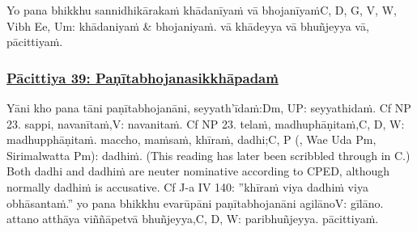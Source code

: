Yo pana bhikkhu sannidhikārakaṁ khādanīyaṁ vā bhojanīyaṁ\makeatletter\hyperlink{endnote-appendix}\makeatother C, D, G, V, W, Vibh Ee, Um: khādaniyaṁ & bhojaniyaṁ. vā khādeyya vā bhuñjeyya vā, pācittiyaṁ.



\subsubsection*{\hyperref[exp39]{Pācittiya 39: Paṇītabhojanasikkhāpadaṁ}}
\label{pac39}

Yāni kho pana tāni paṇītabhojanāni, seyyath'īdaṁ:\makeatletter\hyperlink{endnote-appendix}\makeatother Dm, UP: seyyathidaṁ. Cf NP 23. sappi, navanītaṁ,\makeatletter\hyperlink{endnote-appendix}\makeatother V: navanitaṁ. Cf NP 23. telaṁ, madhuphāṇitaṁ,\makeatletter\hyperlink{endnote-appendix}\makeatother C, D, W: madhupphāṇitaṁ. maccho, maṁsaṁ, khīraṁ, dadhi;\makeatletter\hyperlink{endnote-appendix}\makeatother C, P (, Wae Uda Pm, Sirimalwatta Pm): dadhiṁ. (This reading has later been scribbled through in C.) Both dadhi and dadhiṁ
are neuter nominative according to CPED, although normally dadhiṁ is accusative. Cf J-a IV 140: ”khīraṁ viya dadhiṁ viya
obhāsantaṁ.” yo pana bhikkhu evarūpāni paṇītabhojanāni agilāno\makeatletter\hyperlink{endnote-appendix}\makeatother V: gīlāno. attano atthāya viññāpetvā bhuñjeyya,\makeatletter\hyperlink{endnote-appendix}\makeatother C, D, W: paribhuñjeyya. pācittiyaṁ.



